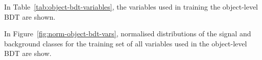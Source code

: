 In Table~\ref{tab:object-bdt-variables}, the variables used in training the object-level BDT are shown.
\begin{table}[htbp!]
\captionsetup{width=0.6\textwidth}
\centering
\caption{A list of the observables used in the object-level BDT, ordered by importance (descending, top to bottom) is shown.}

	\label{tab:object-bdt-variables}
\end{table}

In Figure~\ref{fig:norm-object-bdt-vars}, normalised distributions of the signal and background classes for the training set of all variables used in the object-level BDT are show.



